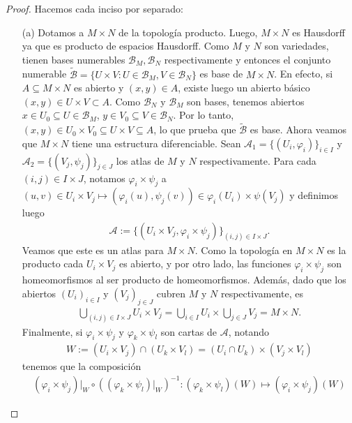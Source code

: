 \documentclass[11pt]{article}
\begin{document}
\begin{proof} Hacemos cada inciso por separado:
\begin{itemize}
\item [(a)] Dotamos a $M \times N$ de la topolog\'ia producto. Luego, $M \times N$ es Hausdorff ya que es producto de espacios Hausdorff. Como $M$ y $N$ son variedades, tienen bases numerables $\mathcal{B}_M, \mathcal{B}_N$ respectivamente y entonces el conjunto numerable $\tilde{\mathcal{B}} = \{U \times V : U \in \mathcal{B}_M, V \in \mathcal{B}_N\}$ es base de $M \times N$. En efecto, si $A \subseteq M \times N$ es abierto y $(x,y) \in A$, existe luego un abierto b\'asico $(x,y) \in U \times V \subset A$. Como $\mathcal{B}_N$ y $\mathcal{B}_M$ son bases, tenemos abiertos $x \in U_0 \subseteq U \in \mathcal{B}_M$, $y \in V_0 \subseteq V \in \mathcal{B}_N$. Por lo tanto, $(x,y) \in U_0 \times V_0 \subseteq U \times V \subseteq A$, lo que prueba que $\tilde{\mathcal{B}}$ es base. Ahora veamos que $M \times N$ tiene una estructura diferenciable. Sean $\mathcal{A}_1 = \{(U_i,\varphi_i)\}_{i \in I}$ y $\mathcal{A}_2 = \{(V_j,\psi_j)\}_{j \in J}$ los atlas de $M$ y $N$ respectivamente. Para cada $(i,j) \in I \times J$, notamos $\varphi_i \times \psi_j$ a $(u,v) \in U_i \times V_j \mapsto (\varphi_i(u), \psi_j(v)) \in \varphi_i(U_i) \times \psi(V_j)$ y definimos luego
\begin{align*}
\mathcal{A} := \{(U_i \times V_j,\varphi_i \times \psi_j) \}_{(i,j) \in I \times J}.
\end{align*}
Veamos que este es un atlas para $M \times N$. Como la topolog\'ia en $M \times N$ es la producto cada $U_i \times V_j$ es abierto, y por otro lado, las funciones $\varphi_i \times \psi_j$ son homeomorfismos al ser producto de homeomorfismos. Adem\'as, dado que los abiertos $(U_i)_{i \in I}$ y $(V_j)_{j \in J}$ cubren $M$ y $N$ respectivamente, es
\begin{align*}
\bigcup_{(i,j) \in I \times J} U_i \times V_j = \bigcup_{i \in I} U_i \times \bigcup_{j \in J} V_j = M \times N.
\end{align*}
Finalmente, si $\varphi_i \times \psi_j$  y $\varphi_k \times \psi_l$ son cartas de $\mathcal{A}$, notando
\begin{align*}
W := (U_i \times V_j) \cap (U_k \times V_l) = (U_i \cap U_k) \times (V_j \times V_l)
\end{align*}
tenemos que la composici\'on 
\begin{align}
(\varphi_i \times \psi_j)|_W \circ ((\varphi_k \times \psi_l)|_W)^{-1} : (\varphi_k \times \psi_l)(W) \mapsto (\varphi_i \times \psi_j)(W)

\end{align}
\end{itemize}
\end{proof}
\end{document}

